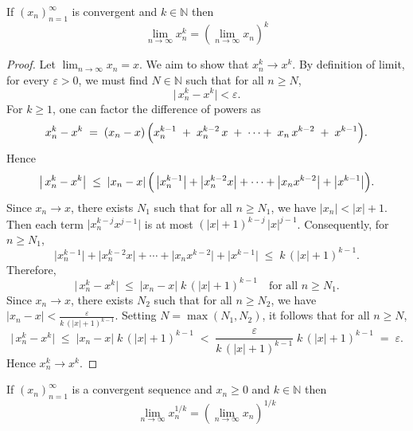 \documentclass[../main.tex]{subfiles}
\begin{document}
    

    
    
    
    \begin{exercise}
    If $ (x_n)^\infty_{n=1}$ is convergent and $ k \in \mathbb{N}$ then
    \[
    \lim_{n \to \infty}{x_n^k} = \left( \lim_{n \to \infty}{x_n}\right)^k
    \]
    \end{exercise}
    
    
    \begin{proof}
        Let \(\lim_{n\to\infty} x_n = x\). We aim to show that \(x_n^k \to x^k\). By definition of limit, for every \(\varepsilon > 0\), we must find \(N \in \mathbb{N}\) such that for all \(n \ge N\),
        \[
        \bigl|\,x_n^k - x^k\bigr| < \varepsilon.
        \]
        For \(k \ge 1\), one can factor the difference of powers as  
        \[
          x_n^k - x^k 
          \;=\; 
          (x_n - x)\,\Bigl(x_n^{k-1} \;+\; x_n^{k-2}\,x \;+\;\cdots+\;x_n\,x^{k-2} \;+\; x^{k-1}\Bigr).
        \]
        Hence
        \[
          \bigl|\,x_n^k - x^k\bigr|
          \;\le\;
          |x_n - x|\,
          \Bigl(\,\bigl|x_n^{k-1}\bigr| + \bigl|x_n^{k-2}x\bigr| + \cdots + \bigl|x_n x^{k-2}\bigr| + \bigl|x^{k-1}\bigr|\Bigr).
        \]
        Since \(x_n \to x\), there exists \(N_1\) such that for all \(n \ge N_1\), we have \(\bigl|x_n\bigr| < |x| + 1\). Then each term \(\bigl|x_n^{k-j}x^{j-1}\bigr|\) is at most \((|x|+1)^{k-j}\,|x|^{j-1}\). Consequently, for \(n \ge N_1\),
   \[
     \bigl|x_n^{k-1}\bigr| + \bigl|x_n^{k-2}x\bigr| + \cdots + \bigl|x_n x^{k-2}\bigr| + \bigl|x^{k-1}\bigr|
     \;\le\;
     k\,(|x|+1)^{k-1}.
   \]
   Therefore,
   \[
     \bigl|\,x_n^k - x^k\bigr|
     \;\le\;
     |x_n - x|\;k\,(|x|+1)^{k-1}
     \quad
     \text{for all } n \ge N_1.
   \]
   Since \(x_n \to x\), there exists \(N_2\) such that for all \(n \ge N_2\), we have \(\bigl|x_n - x\bigr| < \frac{\varepsilon}{k\,(|x|+1)^{k-1}}\). Setting \(N = \max(N_1, N_2)\), it follows that for all \(n \ge N\),
   \[
     \bigl|\,x_n^k - x^k\bigr|
     \;\le\;
     |x_n - x|\;k\,(|x|+1)^{k-1}
     \;<\;
     \frac{\varepsilon}{k\,(|x|+1)^{k-1}} \;k\,(|x|+1)^{k-1}
     \;=\;
     \varepsilon.
   \]
   Hence \(x_n^k \to x^k\).
    \end{proof}
    
    
    
    
    \begin{exercise}
    If $ (x_n)^\infty_{n=1}$ is a convergent sequence and $ x_n \geq 0 $ and $ k \in \mathbb{N}$ then
    \[
    \lim_{n \to \infty}{x_n^{1/k}} = \left( \lim_{n \to \infty}{x_n}\right)^{1/k}
    \]
    \end{exercise}
    
\end{document}
